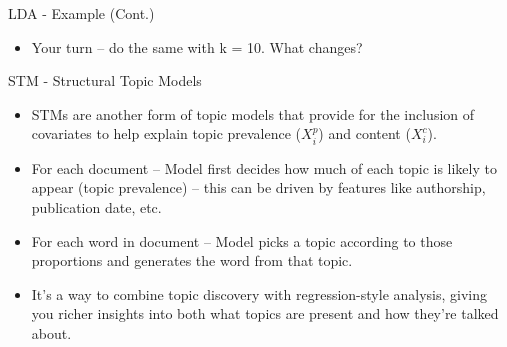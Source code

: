 \documentclass[
  ignorenonframetext,
  aspectratio=169]{beamer}
\begin{document}
\begin{frame}{LDA - Example (Cont.)}
\label{lda---example-cont.-2}
\begin{itemize}
\item Your turn -- do the same with k = 10. What changes?
\end{itemize}
\end{frame}

\begin{frame}{STM - Structural Topic Models}
\label{stm---structural-topic-models}
\begin{itemize}
\item STMs are another form of topic models that provide for the inclusion of covariates to help explain topic prevalence ($X^p_i$) and content ($X^c_i$).  \par \vspace{2.5mm} \pause 
\item For each document -- Model first decides how much of each topic is likely to appear (topic prevalence) – this can be driven by features like authorship, publication date, etc. \par \vspace{2.5mm} \pause 
\item For each word in document -- Model picks a topic according to those proportions and generates the word from that topic. \par \vspace{2.5mm}
\item  It’s a way to combine topic discovery with regression-style analysis, giving you richer insights into both what topics are present and how they’re talked about.
\end{itemize}
\end{frame}
\end{document}

